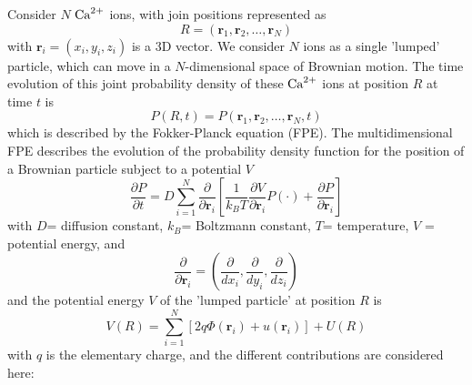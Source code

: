 Consider $N$ ${\text{Ca}^{2+}}$ ions, with join positions represented as 
\begin{equation*}
R = (\mathbf{r}_1, \mathbf{r}_2, \ldots, \mathbf{r}_N)
\end{equation*}
with $\mathbf{r}_i = (x_i,y_i, z_i)$ is a 3D vector. We consider $N$ ions as
a single 'lumped' particle, which can move in a $N$-dimensional space of
Brownian motion.  
The time evolution of this joint probability density of these ${\text{Ca}^{2+}}$ ions at position $R$
at time $t$ is
\begin{equation}
P(R,t) = P(\mathbf{r}_1, \mathbf{r}_2, \ldots, \mathbf{r}_N, t)
\end{equation}
which is described by the Fokker-Planck equation (FPE).
The multidimensional FPE describes the evolution of the probability density
function for the position of a Brownian particle subject to a potential $V$
\begin{equation}
\label{eq:fokker-planck}
\frac{\partial P}{\partial t} = D \sum_{i=1}^N \frac{\partial}{\partial
\mathbf{r}_i} \left[  
\frac{1}{k_BT} \frac{\partial V}{\partial \mathbf{r}_i} P(\cdot) +
\frac{\partial P}{\partial \mathbf{r}_i} \right]
\end{equation}
with $D$= diffusion constant, $k_B$= Boltzmann constant, $T$= temperature, 
$V$ = potential energy, and
\begin{equation}
\frac{\partial}{\partial \mathbf{r}_i} = \left(
\frac{\partial}{dx_i}, \frac{\partial}{dy_i}, \frac{\partial}{dz_i}  
\right)
\end{equation}
and the potential energy $V$ of the 'lumped particle' at position $R$ is
\begin{equation}
V(R) = \sum_{i=1}^{N} \left[ 2q \Phi(\mathbf{r}_i) + u(\mathbf{r}_i) \right] +
U(R)
\end{equation}
with $q$ is the elementary charge, and the different contributions are
considered here:
